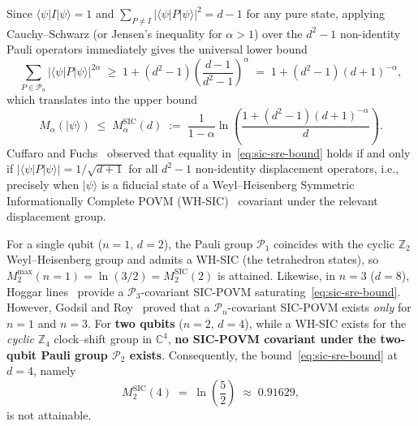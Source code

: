 \documentclass[11pt,a4paper]{article}
\theoremstyle{plain}
\theoremstyle{definition}
\theoremstyle{remark}
\newcommand{\C}{\mathbb{C}}
\newcommand{\Z}{\mathbb{Z}}
\newcommand{\ket}[1]{\lvert #1 \rangle}
\newcommand{\expval}[2]{\langle #1 \vert #2 \vert #1 \rangle}
\newcommand{\Pauli}{\mathcal{P}}
\begin{document}
Since $\expval{\psi}{I} = 1$ and $\sum_{P \neq I} \lvert\expval{\psi}{P}\rvert^2 = d - 1$ for any pure state, applying Cauchy--Schwarz (or Jensen's inequality for $\alpha > 1$) over the $d^2 - 1$ non-identity Pauli operators immediately gives the universal lower bound
\begin{equation}
  \label{eq:sic-moment-bound}
  \sum_{P \in \Pauli_n} \lvert\expval{\psi}{P}\rvert^{2\alpha}
  \;\ge\; 1 + (d^2 - 1)\left(\frac{d - 1}{d^2 - 1}\right)^{\!\alpha}
  \;=\; 1 + (d^2 - 1)(d + 1)^{-\alpha},
\end{equation}
which translates into the upper bound
\begin{equation}
  \label{eq:sic-sre-bound}
  M_\alpha(\ket{\psi}) \;\le\; M_\alpha^{\mathrm{SIC}}(d)
  \;:=\; \frac{1}{1-\alpha}\ln\!\left(\frac{1 + (d^2-1)(d+1)^{-\alpha}}{d}\right).
\end{equation}
Cuffaro and Fuchs~\cite{CuffaroFuchs2024} observed that equality in~\eqref{eq:sic-sre-bound} holds if and only if $\lvert\expval{\psi}{P}\rvert = 1/\sqrt{d+1}$ for all $d^2 - 1$ non-identity displacement operators, i.e., precisely when $\ket{\psi}$ is a fiducial state of a Weyl--Heisenberg Symmetric Informationally Complete POVM (WH-SIC)~\cite{Zauner1999,Renes2004} covariant under the relevant displacement group.

For a single qubit ($n=1$, $d=2$), the Pauli group $\Pauli_1$ coincides with the cyclic $\Z_2$ Weyl--Heisenberg group and admits a WH-SIC (the tetrahedron states), so $M_2^{\max}(n=1) = \ln(3/2) = M_2^{\mathrm{SIC}}(2)$ is attained. Likewise, in $n=3$ ($d=8$), Hoggar lines~\cite{Hoggar1998} provide a $\Pauli_3$-covariant SIC-POVM saturating~\eqref{eq:sic-sre-bound}. However, Godsil and Roy~\cite{GodsilRoy2009} proved that a $\Pauli_n$-covariant SIC-POVM exists \emph{only} for $n=1$ and $n=3$. For \textbf{two qubits} ($n=2$, $d=4$), while a WH-SIC exists for the \emph{cyclic} $\Z_4$ clock--shift group in $\C^4$, \textbf{no SIC-POVM covariant under the two-qubit Pauli group $\Pauli_2$ exists}. Consequently, the bound~\eqref{eq:sic-sre-bound} at $d=4$, namely
\begin{equation}
  M_2^{\mathrm{SIC}}(4) \;=\; \ln\!\left(\frac{5}{2}\right) \;\approx\; 0.91629,
\end{equation}
is not attainable.
\end{document}
